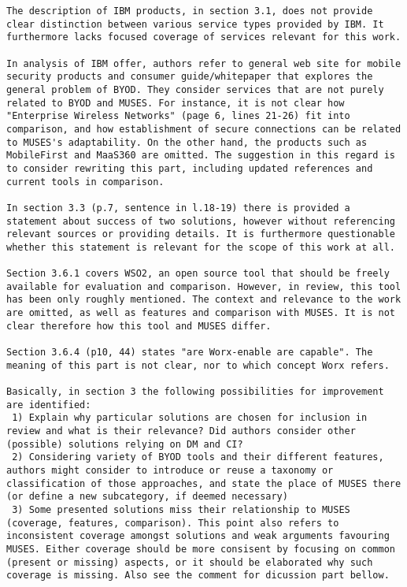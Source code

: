 \documentclass[preprint]{elsarticle}
\begin{document}
\begin{verbatim}
The description of IBM products, in section 3.1, does not provide clear distinction between various service types provided by IBM. It furthermore lacks focused coverage of services relevant for this work.

In analysis of IBM offer, authors refer to general web site for mobile security products and consumer guide/whitepaper that explores the general problem of BYOD. They consider services that are not purely related to BYOD and MUSES. For instance, it is not clear how "Enterprise Wireless Networks" (page 6, lines 21-26) fit into comparison, and how establishment of secure connections can be related to MUSES's adaptability. On the other hand, the products such as MobileFirst and MaaS360 are omitted. The suggestion in this regard is to consider rewriting this part, including updated references and current tools in comparison.

In section 3.3 (p.7, sentence in l.18-19) there is provided a statement about success of two solutions, however without referencing relevant sources or providing details. It is furthermore questionable whether this statement is relevant for the scope of this work at all.

Section 3.6.1 covers WSO2, an open source tool that should be freely available for evaluation and comparison. However, in review, this tool has been only roughly mentioned. The context and relevance to the work are omitted, as well as features and comparison with MUSES. It is not clear therefore how this tool and MUSES differ.

Section 3.6.4 (p10, 44) states "are Worx-enable are capable". The meaning of this part is not clear, nor to which concept Worx refers.

Basically, in section 3 the following possibilities for improvement are identified:
 1) Explain why particular solutions are chosen for inclusion in review and what is their relevance? Did authors consider other (possible) solutions relying on DM and CI?
 2) Considering variety of BYOD tools and their different features, authors might consider to introduce or reuse a taxonomy or classification of those approaches, and state the place of MUSES there (or define a new subcategory, if deemed necessary)
 3) Some presented solutions miss their relationship to MUSES (coverage, features, comparison). This point also refers to inconsistent coverage amongst solutions and weak arguments favouring MUSES. Either coverage should be more consisent by focusing on common (present or missing) aspects, or it should be elaborated why such coverage is missing. Also see the comment for dicussion part bellow.


\end{verbatim}
\end{document}
